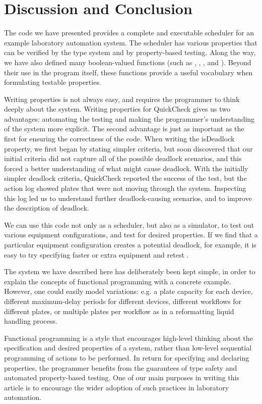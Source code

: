\documentclass{article}
\begin{document}
\section{Discussion and Conclusion}

The code we have presented provides a complete and executable scheduler for an example laboratory automation system.  The scheduler has various properties that can be verified by the type system and by property-based testing. Along the way, we have also defined many boolean-valued functions (such as , , , and ).  Beyond their use in the program itself, these functions provide a useful vocabulary when formulating testable properties.

Writing properties is not always easy, and requires the programmer to think deeply about the system.  Writing properties for QuickCheck gives us two advantages: automating the testing and making the programmer's understanding of the system more explicit. The second advantage is just as important as the first for ensuring the correctness of the code.  When writing the isDeadlock property, we first began by stating simpler criteria, but soon discovered that our initial criteria did not capture all of the possible deadlock scenarios, and this forced a better understanding of what might cause deadlock. With the initially simpler deadlock criteria, QuickCheck reported the success of the test, but the action log showed plates that were not moving through the system. Inspecting this log led us to understand further deadlock-causing scenarios, and to improve the description of deadlock.

We can use this code not only as a scheduler, but also as a simulator, to test out various equipment configurations, and test for desired properties. If we find that a particular equipment configuration creates a potential deadlock, for example, it is easy to try specifying faster or extra equipment and retest .

The system we have described here has deliberately been kept simple, in order to explain the concepts of functional programming with a concrete example. However, one could easily model variations: e.g. a plate capacity for each device, different maximum-delay periods for different devices, different workflows for different plates, or multiple plates per workflow as in a reformatting liquid handling process.

Functional programming is a style that encourages high-level thinking about the specification and desired properties of a system, rather than low-level sequential programming of actions to be performed. In return for specifying and declaring properties, the programmer benefits from the guarantees of type safety and automated property-based testing.  One of our main purposes in writing this article is to encourage the wider adoption of such practices in laboratory automation.
\end{document}
